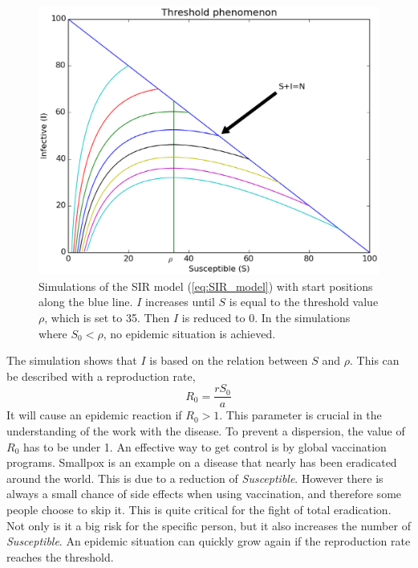 \documentclass[%
twoside,                 %
final,                   %
10pt]{article}
\begin{document}
\begin{figure}[ht]
  \centerline{\includegraphics[width=0.9\linewidth]{plots/threshold_phenomenon.eps}}
  \caption{
  \label{fig:threshold_phenomenon} Simulations of the SIR model (\ref{eq:SIR_model}) with start positions along the blue line. $I$ increases until $S$ is equal to the threshold value $\rho$, which is set to 35. Then $I$ is reduced to 0. In the simulations where $S_0 < \rho$, no epidemic situation is achieved.
  }
\end{figure}


The simulation shows that $I$ is based on the relation between $S$ and $\rho$. This can be described with a reproduction rate,
\begin{equation}
R_0 = \frac{rS_0}{a}
\end{equation}
It will cause an epidemic reaction if $R_0 > 1$. This parameter is crucial in the understanding of the work with the disease. To prevent a dispersion, the value of $R_0$ has to be under 1. An effective way to get control is by global vaccination programs. Smallpox is an example on a disease that nearly has been eradicated around the world. This is due to a reduction of \emph{Susceptible}. However there is always a small chance of side effects when using vaccination, and therefore some people choose to skip it. This is quite critical for the fight of total eradication. Not only is it a big risk for the specific person, but it also increases the number of \emph{Susceptible}. An epidemic situation can quickly grow again if the reproduction rate reaches the threshold.


\vspace{3mm}
\end{document}
